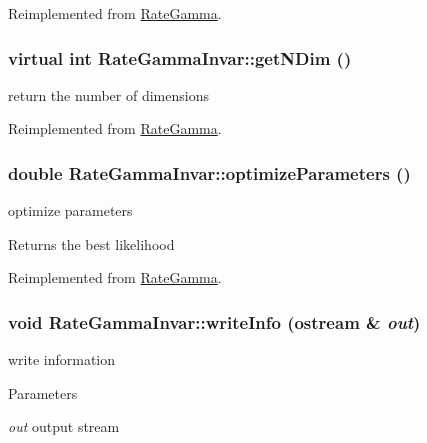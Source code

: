 Reimplemented from \hyperlink{classRateGamma_a24e01b7ec0d9170ceebcf03b603b2bbb}{RateGamma}.\hypertarget{classRateGammaInvar_a4f276d1639a79eece217b365439049c7}{
\subsubsection[{getNDim}]{\setlength{\rightskip}{0pt plus 5cm}virtual int RateGammaInvar::getNDim ()}}
\label{classRateGammaInvar_a4f276d1639a79eece217b365439049c7}
return the number of dimensions 

Reimplemented from \hyperlink{classRateGamma_af271c0115c8a81ff6fac32d1cfef6187}{RateGamma}.\hypertarget{classRateGammaInvar_ab72a2559cea978d312a243d521c2abef}{
\subsubsection[{optimizeParameters}]{\setlength{\rightskip}{0pt plus 5cm}double RateGammaInvar::optimizeParameters ()}}
\label{classRateGammaInvar_ab72a2559cea978d312a243d521c2abef}
optimize parameters \begin{DoxyReturn}{Returns}
the best likelihood 
\end{DoxyReturn}


Reimplemented from \hyperlink{classRateGamma_aadba870d743295ef057f9c78ac7fdd06}{RateGamma}.\hypertarget{classRateGammaInvar_a428c3ac79ba1bf28da546f602d4b0f7b}{
\subsubsection[{writeInfo}]{\setlength{\rightskip}{0pt plus 5cm}void RateGammaInvar::writeInfo (ostream \& {\em out})}}
\label{classRateGammaInvar_a428c3ac79ba1bf28da546f602d4b0f7b}
write information 
\begin{DoxyParams}{Parameters}
\item[{\em out}]output stream \end{DoxyParams}


